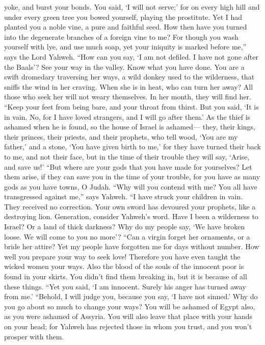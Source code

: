 yoke, and burst your bonds. You said, `I will not serve;' for on every
high hill and under every green tree you bowed yourself, playing the
prostitute.  Yet I had planted you a noble vine, a pure and
faithful seed. How then have you turned into the degenerate branches of
a foreign vine to me?  For though you wash yourself with
lye, and use much soap, yet your iniquity is marked before me,'' says
the Lord Yahweh.  ``How can you say, `I am not defiled. I
have not gone after the Baals'? See your way in the valley. Know what
you have done. You are a swift dromedary traversing her ways,
 a wild donkey used to the wilderness, that sniffs the wind
in her craving. When she is in heat, who can turn her away? All those
who seek her will not weary themselves. In her month, they will find
her.  ``Keep your feet from being bare, and your throat
from thirst. But you said, `It is in vain. No, for I have loved
strangers, and I will go after them.'  As the thief is
ashamed when he is found, so the house of Israel is ashamed--- they,
their kings, their princes, their priests, and their prophets,
 who tell wood, `You are my father,' and a stone, `You have
given birth to me,' for they have turned their back to me, and not their
face, but in the time of their trouble they will say, `Arise, and save
us!'  ``But where are your gods that you have made for
yourselves? Let them arise, if they can save you in the time of your
trouble, for you have as many gods as you have towns, O Judah.
 ``Why will you contend with me? You all have transgressed
against me,'' says Yahweh.  ``I have struck your children
in vain. They received no correction. Your own sword has devoured your
prophets, like a destroying lion.  Generation, consider
Yahweh's word. Have I been a wilderness to Israel? Or a land of thick
darkness? Why do my people say, `We have broken loose. We will come to
you no more'?  ``Can a virgin forget her ornaments, or a
bride her attire? Yet my people have forgotten me for days without
number.  How well you prepare your way to seek love!
Therefore you have even taught the wicked women your ways. 
Also the blood of the souls of the innocent poor is found in your
skirts. You didn't find them breaking in, but it is because of all these
things.  ``Yet you said, `I am innocent. Surely his anger
has turned away from me.' ``Behold, I will judge you, because you say,
`I have not sinned.'  Why do you go about so much to change
your ways? You will be ashamed of Egypt also, as you were ashamed of
Assyria.  You will also leave that place with your hands on
your head; for Yahweh has rejected those in whom you trust, and you
won't prosper with them.

